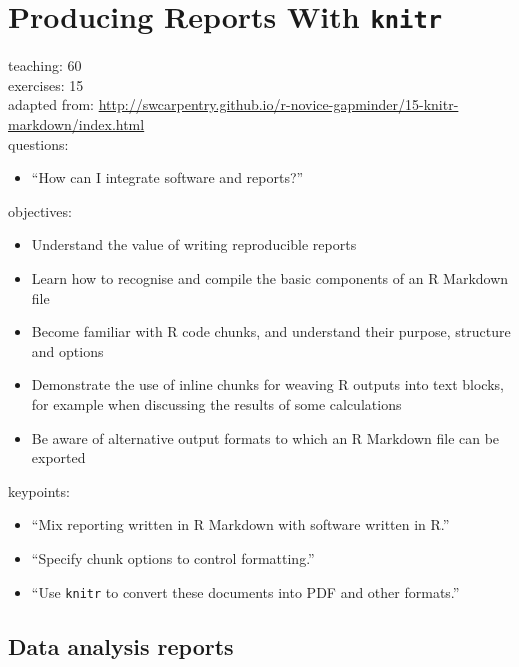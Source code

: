 \documentclass[]{book}
\providecommand{\tightlist}{%
  \setlength{\itemsep}{0pt}\setlength{\parskip}{0pt}}
\begin{document}
\chapter{\texorpdfstring{Producing Reports With
\texttt{knitr}}{Producing Reports With knitr}}\label{knitr}

teaching: 60\\
exercises: 15\\
adapted from:
\url{http://swcarpentry.github.io/r-novice-gapminder/15-knitr-markdown/index.html}\\
questions:

\begin{itemize}
\tightlist
\item
  ``How can I integrate software and reports?''
\end{itemize}

objectives:

\begin{itemize}
\tightlist
\item
  Understand the value of writing reproducible reports\\
\item
  Learn how to recognise and compile the basic components of an R
  Markdown file\\
\item
  Become familiar with R code chunks, and understand their purpose,
  structure and options\\
\item
  Demonstrate the use of inline chunks for weaving R outputs into text
  blocks, for example when discussing the results of some calculations\\
\item
  Be aware of alternative output formats to which an R Markdown file can
  be exported
\end{itemize}

keypoints:

\begin{itemize}
\tightlist
\item
  ``Mix reporting written in R Markdown with software written in R.''\\
\item
  ``Specify chunk options to control formatting.''\\
\item
  ``Use \texttt{knitr} to convert these documents into PDF and other
  formats.''
\end{itemize}

\section{Data analysis reports}\label{data-analysis-reports}
\end{document}
